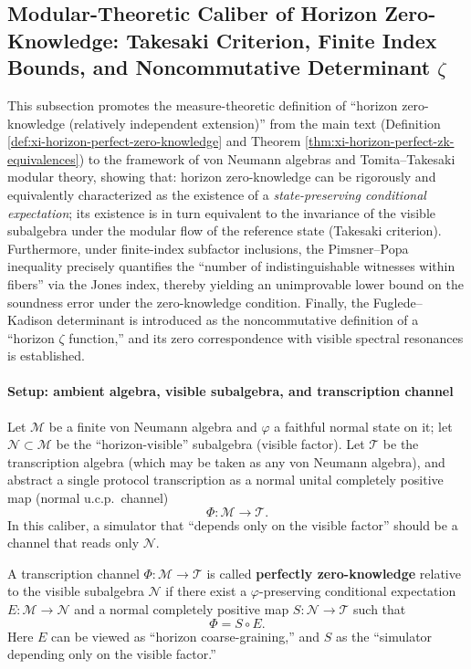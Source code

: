 \subsection{Modular-Theoretic Caliber of Horizon Zero-Knowledge: Takesaki Criterion, Finite Index Bounds, and Noncommutative Determinant \texorpdfstring{$\zeta$}{zeta}}\label{subsec:op-algebra-modular-zk-index-fkdet}
This subsection promotes the measure-theoretic definition of ``horizon zero-knowledge (relatively independent extension)'' from the main text (Definition \ref{def:xi-horizon-perfect-zero-knowledge} and Theorem \ref{thm:xi-horizon-perfect-zk-equivalences})
to the framework of von Neumann algebras and Tomita--Takesaki modular theory, showing that:
horizon zero-knowledge can be rigorously and equivalently characterized as the existence of a \emph{state-preserving conditional expectation}; its existence is in turn equivalent to the invariance of the visible subalgebra under the modular flow of the reference state (Takesaki criterion).
Furthermore, under finite-index subfactor inclusions, the Pimsner--Popa inequality precisely quantifies the ``number of indistinguishable witnesses within fibers'' via the Jones index, thereby yielding an unimprovable lower bound on the soundness error under the zero-knowledge condition.
Finally, the Fuglede--Kadison determinant is introduced as the noncommutative definition of a ``horizon \(\zeta\) function,'' and its zero correspondence with visible spectral resonances is established.

\paragraph{Setup: ambient algebra, visible subalgebra, and transcription channel}
Let \(\mathcal{M}\) be a finite von Neumann algebra and \(\varphi\) a faithful normal state on it;
let \(\mathcal{N}\subset \mathcal{M}\) be the ``horizon-visible'' subalgebra (visible factor).
Let \(\mathcal{T}\) be the transcription algebra (which may be taken as any von Neumann algebra), and abstract a single protocol transcription as a normal unital completely positive map (normal u.c.p.\ channel)
\[
\Phi:\mathcal{M}\to\mathcal{T}.
\]
In this caliber, a simulator that ``depends only on the visible factor'' should be a channel that reads only \(\mathcal{N}\).

\begin{definition}\label{def:op-algebra-horizon-perfect-zk}
A transcription channel \(\Phi:\mathcal{M}\to\mathcal{T}\) is called \textbf{perfectly zero-knowledge} relative to the visible subalgebra \(\mathcal{N}\)
if there exist a \(\varphi\)-preserving conditional expectation \(E:\mathcal{M}\to\mathcal{N}\) and a normal completely positive map \(S:\mathcal{N}\to\mathcal{T}\) such that
\begin{equation}\label{eq:op-algebra-zk-factorization}
\boxed{\;\Phi=S\circ E.\;}
\end{equation}
Here \(E\) can be viewed as ``horizon coarse-graining,'' and \(S\) as the ``simulator depending only on the visible factor.''
\end{definition}

